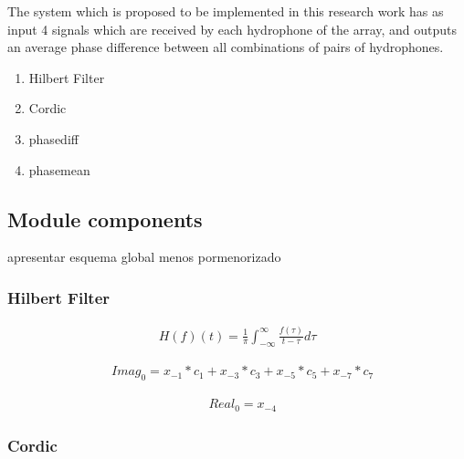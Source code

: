 The system which is proposed to be implemented in this research work has as input 4 signals which are received by each hydrophone of the array, and outputs an average phase difference between all combinations of pairs of hydrophones. 



\begin{enumerate}
	\item Hilbert Filter
	\item Cordic
	\item phasediff
	\item phasemean
\end{enumerate}

\subsection{Module components}

apresentar esquema global menos pormenorizado

\subsubsection{Hilbert Filter}

\begin{eqnarray}
H(f)(t) = \frac{1}{\pi}\int_{-\infty}^{\infty}\frac{f(\tau)}{t-\tau}d\tau
\label{eq:hilbert_integral}
\end{eqnarray}

\begin{eqnarray}
&Imag_0 = x_{-1}*c_1 + x_{-3}*c_3 + x_{-5}*c_5 + x_{-7}*c_7
\label{eq:hilbert_imeq}
\end{eqnarray}

\begin{eqnarray}
&Real_0 = x_{-4} 
\label{eq:hilbert_reeq}
\end{eqnarray}


\subsubsection{Cordic}

